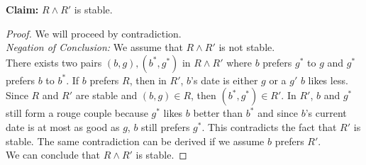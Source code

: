 \documentclass[11pt]{article}
\begin{document}
\begin{Parts}
\begin{Answer}
            \textbf{Claim:} $R \land R'$ is stable. 
            \begin{proof}
                We will proceed by contradiction. \\
                \emph{Negation of Conclusion:} We assume that $R \land R'$ is not stable. \\
                There exists two pairs $(b,g),(b^*,g^*)$ in $R \land R'$ where $b$ prefers $g^*$ to $g$ and $g^*$ prefers $b$ to $b^*$. 
                If $b$ prefers $R$, then in $R'$, $b$'s date is either $g$ or a $g'$ $b$ likes less. Since $R$ and $R'$ are stable and 
                $(b,g) \in R$, then $(b^*,g^*) \in R'$. In $R'$, $b$ and $g^*$ still form a rouge couple because $g^*$ likes $b$ better 
                than $b^*$ and since $b$'s current date is at most as good as $g$, $b$ still prefers $g^*$. This contradicts the fact 
                that $R'$ is stable. The same contradiction can be derived if we assume $b$ prefers $R'$. \\
                We can conclude that $R \land R'$ is stable. 
            \end{proof}
        \end{Answer}

    \end{Parts}

    \newpage
\end{document}
